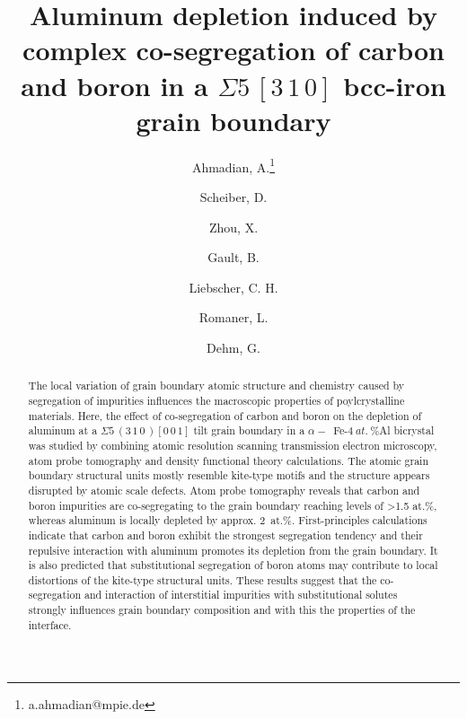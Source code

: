 \documentclass[12pt,a4paper,twoside,twocolumn,english,english]{article}
\title{Aluminum depletion induced by complex co-segregation of carbon and boron in a $\Sigma5\,[3\,1\,0]$ bcc-iron grain boundary}
\author[1]{Ahmadian, A.\thanks{a.ahmadian@mpie.de}}
\author[2]{Scheiber, D.}
\author[1]{Zhou, X.}
\author[1]{Gault, B.}
\author[1]{Liebscher, C. H.}
\author[2]{Romaner, L.}
\author[1]{Dehm, G.}
\affil[1]{Max-Planck-Institut fuer Eisenforschung GmbH, 40237 Düsseldorf, Germany}
\affil[2]{Materials Center Leoben GmbH, 8700 Leoben, Austria}
\date{}                     %
\begin{document}
\maketitle

\begin{otherlanguage}{english}
\begin{abstract}
The local variation of grain boundary atomic structure and chemistry caused by segregation of impurities influences the macroscopic properties of poylcrystalline materials. Here, the effect of co-segregation of carbon and boron on the depletion of aluminum at a $\Sigma 5\,(3\,1\,0\,) [0\,0\,1]$ tilt grain boundary in a $\alpha-$~Fe-$4~at.~\%$Al bicrystal was studied by combining atomic resolution scanning transmission electron microscopy, atom probe tomography and density functional theory calculations. The atomic grain boundary structural units mostly resemble kite-type motifs and the structure appears disrupted by atomic scale defects. Atom probe tomography reveals that carbon and boron impurities are co-segregating to the grain boundary reaching levels of >1.5 at.\%, whereas aluminum is locally depleted by 
approx. 2~at.\%. First-principles calculations indicate that carbon and boron exhibit the strongest segregation tendency and their repulsive interaction with aluminum promotes its depletion from the grain boundary. It is also predicted that substitutional segregation of boron atoms may contribute to local distortions of the kite-type structural units. These results suggest that the co-segregation and interaction of interstitial impurities with substitutional solutes strongly influences grain boundary composition and with this the properties of the interface.   
\end{abstract}


\end{otherlanguage}
\end{document}
